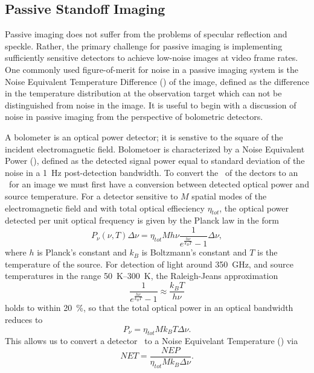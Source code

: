 \subsection{Passive Standoff Imaging}

Passive imaging does not suffer from the problems of specular reflection and speckle.
Rather, the primary challenge for passive imaging is implementing sufficiently sensitive detectors to achieve low-noise images at video frame rates.
One commonly used figure-of-merit for noise in a passive imaging system is the Noise Equivalent Temperature Difference (\NETD) of the image, defined as the difference in the temperature distribution at the observation target which can not be distinguished from noise in the image.
It is useful to begin with a discussion of noise in passive imaging from the perspective of bolometric detectors.

A bolometer is an optical power detector; it is senstive to the square of the incident electromagnetic field.
Bolometoer is characterized by a Noise Equivalent Power (\NEP), defined as the detected signal power equal to standard deviation of the noise in a \SI{1}{\Hz} post-detection bandwidth.
To convert the \NEP\ of the dectors to an \NETD\ for an image we must first have a conversion between detected optical power and source temperature.
For a detector sensitive to $M$ spatial modes of the electromagnetic field and with total optical effieciency $\eta_{tot}$, the optical power detected per unit optical frequency is given by the Planck law in the form
\begin{equation} \label{eqn:ch1-planck}
  P_{\nu}(\nu,T) \Delta \nu = \eta_{tot} M h \nu \frac{1}{e^{\frac{h \nu}{k_B T}} - 1} \Delta \nu,
\end{equation}
where $h$ is Planck's constant and $k_B$ is Boltzmann's constant and $T$ is the temperature of the source.
For detection of light around \SI{350}{\GHz}, and source temperatures in the range \SIrange{50}{300}{\K}, the Raleigh-Jeans approximation
\begin{equation}
  \frac{1}{e^{\frac{h \nu}{k_B T}} - 1} \approx \frac{k_B T}{h \nu}
\end{equation}
holds to within \SI{20}{\percent}, so that the total optical power in an optical bandwidth reduces to 
\begin{equation}
  P_{\nu} = \eta_{tot} M k_B T \Delta \nu.
\end{equation}
This allows us to convert a detector \NEP\ to a Noise Equivelant Temperature (\NET) via
\begin{equation}
  NET = \frac{NEP}{\eta_{tot} M k_B \Delta \nu}.
\end{equation}

